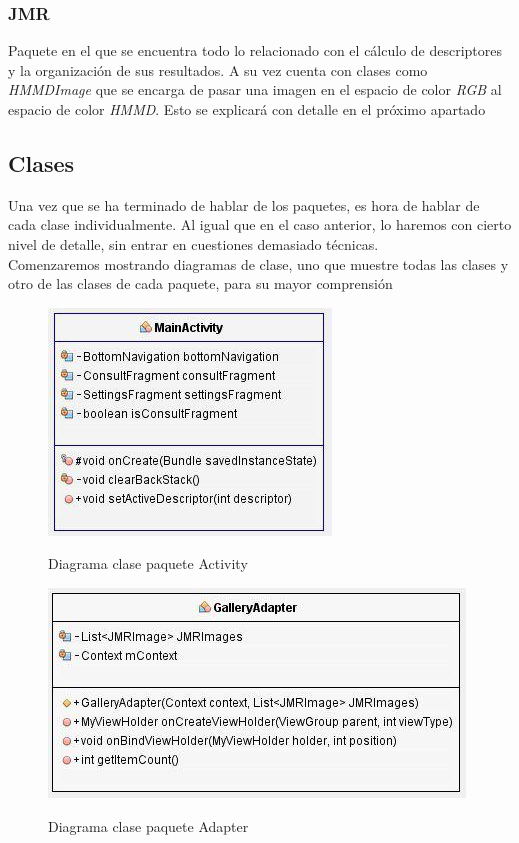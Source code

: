 \subsubsection{JMR}

Paquete en el que se encuentra todo lo relacionado con el cálculo de descriptores y la organización de sus resultados. A su vez cuenta con clases como \textit{HMMDImage} que se encarga de pasar una imagen en el espacio de color \textit{RGB} al espacio de color \textit{HMMD}. Esto se explicará con detalle en el próximo apartado

\subsection{Clases}

Una vez que se ha terminado de hablar de los paquetes, es hora de hablar de cada clase individualmente. Al igual que en el caso anterior, lo haremos con cierto nivel de detalle, sin entrar en cuestiones demasiado técnicas.\\

Comenzaremos mostrando diagramas de clase, uno que muestre todas las clases y otro de las clases de cada paquete, para su mayor comprensión

\begin{figure}[H] %
\centering
\includegraphics[scale=0.6]{imagenes/diagrama1.jpg}  %
\label{diagrama1}
\caption{Diagrama clase paquete Activity}
\end{figure}

\begin{figure}[H] %
\centering
\includegraphics[scale=0.6]{imagenes/diagrama2.jpg}  %
\label{diagrama2}
\caption{Diagrama clase paquete Adapter}
\end{figure}

